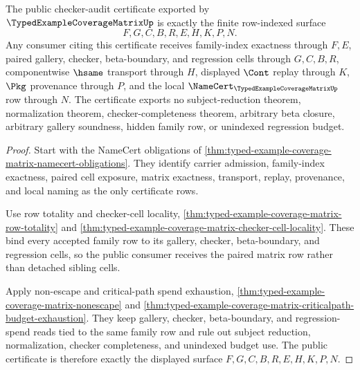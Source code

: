 \begin{theorem}
\label{thm:typed-example-coverage-matrix-public-certificate}
The public checker-audit certificate exported by $\TypedExampleCoverageMatrixUp$ is exactly the finite row-indexed surface
$$
F,G,C,B,R,E,H,K,P,N .
$$
Any consumer citing this certificate receives family-index exactness through $F,E$, paired gallery, checker, beta-boundary, and regression cells through $G,C,B,R$, componentwise $\hsame$ transport through $H$, displayed $\Cont$ replay through $K$, $\Pkg$ provenance through $P$, and the local $\NameCert_{\TypedExampleCoverageMatrixUp}$ row through $N$. The certificate exports no subject-reduction theorem, normalization theorem, checker-completeness theorem, arbitrary beta closure, arbitrary gallery soundness, hidden family row, or unindexed regression budget.
\end{theorem}
\begin{proof}
Start with the NameCert obligations of \autoref{thm:typed-example-coverage-matrix-namecert-obligations}. They identify carrier admission, family-index exactness, paired cell exposure, matrix exactness, transport, replay, provenance, and local naming as the only certificate rows.

Use row totality and checker-cell locality, \autoref{thm:typed-example-coverage-matrix-row-totality} and \autoref{thm:typed-example-coverage-matrix-checker-cell-locality}. These bind every accepted family row to its gallery, checker, beta-boundary, and regression cells, so the public consumer receives the paired matrix row rather than detached sibling cells.

Apply non-escape and critical-path spend exhaustion, \autoref{thm:typed-example-coverage-matrix-nonescape} and \autoref{thm:typed-example-coverage-matrix-criticalpath-budget-exhaustion}. They keep gallery, checker, beta-boundary, and regression-spend reads tied to the same family row and rule out subject reduction, normalization, checker completeness, and unindexed budget use. The public certificate is therefore exactly the displayed surface $F,G,C,B,R,E,H,K,P,N$.
\end{proof}

